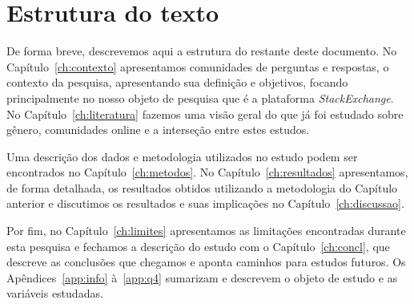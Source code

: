 \section{Estrutura do texto}

De forma breve, descrevemos aqui a estrutura do restante deste documento. No Capítulo~\ref{ch:contexto} apresentamos comunidades de perguntas e respostas, o contexto da pesquisa, apresentando sua definição e objetivos, focando principalmente no nosso objeto de pesquisa que é a plataforma \emph{StackExchange}. No Capítulo~\ref{ch:literatura} fazemos uma visão geral do que já foi estudado sobre gênero, comunidades online e a interseção entre estes estudos.

Uma descrição dos dados e metodologia utilizados no estudo podem ser encontrados no Capítulo~\ref{ch:metodos}. No Capítulo~\ref{ch:resultados} apresentamos, de forma detalhada, os resultados obtidos utilizando a metodologia do Capítulo anterior e discutimos os resultados e suas implicações no Capítulo~\ref{ch:discussao}.

Por fim, no Capítulo~\ref{ch:limites} apresentamos as limitações encontradas durante esta pesquisa e fechamos a descrição do estudo com o Capítulo~\ref{ch:concl}, que descreve as conclusões que chegamos e aponta caminhos para estudos futuros. Os Apêndices~\ref{app:info} à~\ref{app:q4} sumarizam e descrevem o objeto de estudo e as variáveis estudadas.


